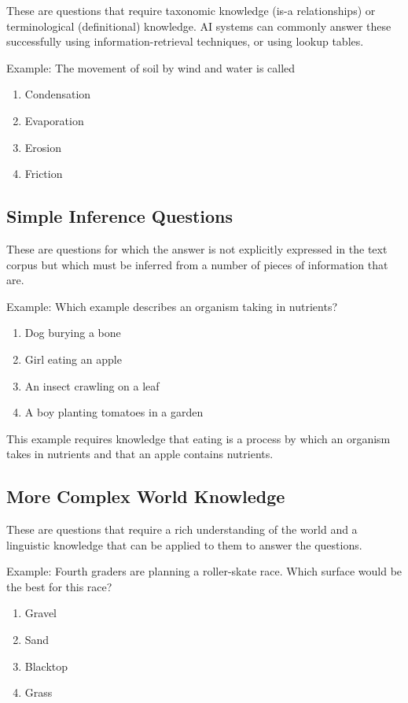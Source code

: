 These are questions that require taxonomic knowledge (is-a relationships) or terminological (definitional) knowledge.  AI systems can commonly answer these successfully using information-retrieval techniques, or using lookup tables.  


Example: The movement of soil by wind and water is called \cite{clark2015elementary}

\begin{enumerate}[label=\Alph*.]
\item Condensation
\item Evaporation
\item Erosion
\item Friction
\end{enumerate}

\subsection{Simple Inference Questions}
These are questions for which the answer is not explicitly expressed in the text corpus but which must be inferred from a number of pieces of information that are.

Example: Which example describes an organism taking in nutrients? \cite{clark2015elementary}

\begin{enumerate}[label=\Alph*.]
\item Dog burying a bone
\item Girl eating an apple
\item An insect crawling on a leaf
\item A boy planting tomatoes in a garden
\end{enumerate}

This example requires knowledge that eating is a process by which an organism takes in nutrients and that an apple contains nutrients.

\subsection{More Complex World Knowledge}

These are questions that require a rich understanding of the world and a linguistic knowledge that can be applied to them to answer the questions.

Example: \cite{clark2015elementary}  Fourth graders are planning a roller-skate race.  Which surface would be the best for this race?  

\begin{enumerate}[label=\Alph*.]
\item Gravel
\item Sand
\item Blacktop
\item Grass
\end{enumerate}

